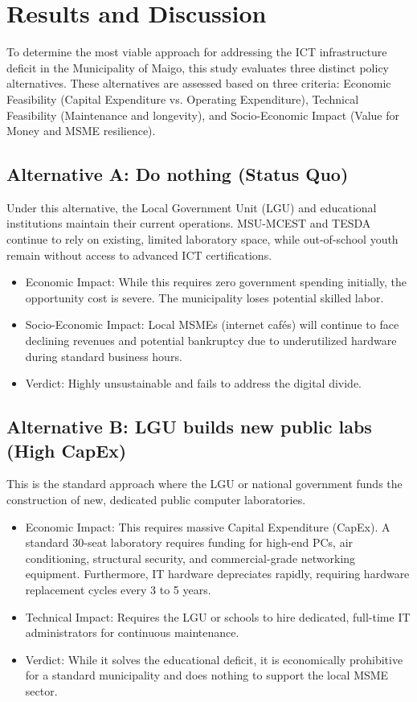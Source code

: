 \section{Results and Discussion}
To determine the most viable approach for addressing the ICT infrastructure deficit in the Municipality of Maigo, this study evaluates three distinct policy alternatives. These alternatives are assessed based on three criteria: Economic Feasibility (Capital Expenditure vs. Operating Expenditure), Technical Feasibility (Maintenance and longevity), and Socio-Economic Impact (Value for Money and MSME resilience).

\subsection{Alternative A: Do nothing (Status Quo)}
Under this alternative, the Local Government Unit (LGU) and educational institutions maintain their current operations. MSU-MCEST and TESDA continue to rely on existing, limited laboratory space, while out-of-school youth remain without access to advanced ICT certifications.

\begin{itemize}
    \item Economic Impact: While this requires zero government spending initially, the opportunity cost is severe. The municipality loses potential skilled labor.
    \item Socio-Economic Impact: Local MSMEs (internet cafés) will continue to face declining revenues and potential bankruptcy due to underutilized hardware during standard business hours.
    \item Verdict: Highly unsustainable and fails to address the digital divide.
\end{itemize}

\subsection{Alternative B: LGU builds new public labs (High CapEx)}
This is the standard approach where the LGU or national government funds the construction of new, dedicated public computer laboratories.

\begin{itemize}
    \item Economic Impact: This requires massive Capital Expenditure (CapEx). A standard 30-seat laboratory requires funding for high-end PCs, air conditioning, structural security, and commercial-grade networking equipment. Furthermore, IT hardware depreciates rapidly, requiring hardware replacement cycles every 3 to 5 years.
    \item Technical Impact: Requires the LGU or schools to hire dedicated, full-time IT administrators for continuous maintenance.
    \item Verdict: While it solves the educational deficit, it is economically prohibitive for a standard municipality and does nothing to support the local MSME sector.
\end{itemize}

